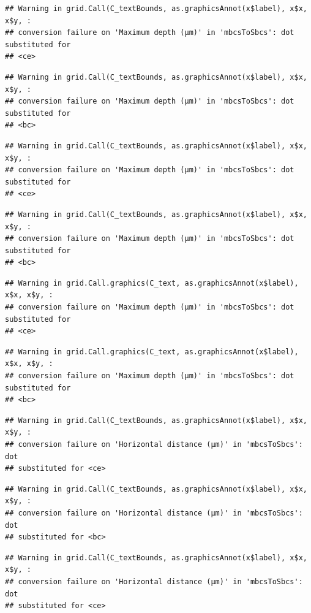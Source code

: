 \documentclass[
]{article}
\begin{document}
\begin{verbatim}
## Warning in grid.Call(C_textBounds, as.graphicsAnnot(x$label), x$x, x$y, :
## conversion failure on 'Maximum depth (μm)' in 'mbcsToSbcs': dot substituted for
## <ce>
\end{verbatim}

\begin{verbatim}
## Warning in grid.Call(C_textBounds, as.graphicsAnnot(x$label), x$x, x$y, :
## conversion failure on 'Maximum depth (μm)' in 'mbcsToSbcs': dot substituted for
## <bc>
\end{verbatim}

\begin{verbatim}
## Warning in grid.Call(C_textBounds, as.graphicsAnnot(x$label), x$x, x$y, :
## conversion failure on 'Maximum depth (μm)' in 'mbcsToSbcs': dot substituted for
## <ce>
\end{verbatim}

\begin{verbatim}
## Warning in grid.Call(C_textBounds, as.graphicsAnnot(x$label), x$x, x$y, :
## conversion failure on 'Maximum depth (μm)' in 'mbcsToSbcs': dot substituted for
## <bc>
\end{verbatim}

\begin{verbatim}
## Warning in grid.Call.graphics(C_text, as.graphicsAnnot(x$label), x$x, x$y, :
## conversion failure on 'Maximum depth (μm)' in 'mbcsToSbcs': dot substituted for
## <ce>
\end{verbatim}

\begin{verbatim}
## Warning in grid.Call.graphics(C_text, as.graphicsAnnot(x$label), x$x, x$y, :
## conversion failure on 'Maximum depth (μm)' in 'mbcsToSbcs': dot substituted for
## <bc>
\end{verbatim}

\begin{verbatim}
## Warning in grid.Call(C_textBounds, as.graphicsAnnot(x$label), x$x, x$y, :
## conversion failure on 'Horizontal distance (μm)' in 'mbcsToSbcs': dot
## substituted for <ce>
\end{verbatim}

\begin{verbatim}
## Warning in grid.Call(C_textBounds, as.graphicsAnnot(x$label), x$x, x$y, :
## conversion failure on 'Horizontal distance (μm)' in 'mbcsToSbcs': dot
## substituted for <bc>
\end{verbatim}

\begin{verbatim}
## Warning in grid.Call(C_textBounds, as.graphicsAnnot(x$label), x$x, x$y, :
## conversion failure on 'Horizontal distance (μm)' in 'mbcsToSbcs': dot
## substituted for <ce>
\end{verbatim}
\end{document}
